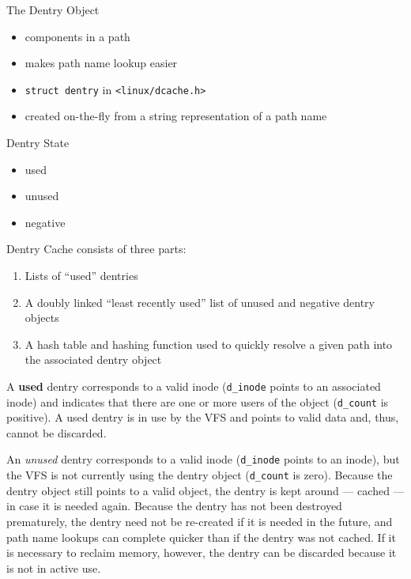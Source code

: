 \begin{frame}
  \begin{block}{The Dentry Object}
    \begin{itemize}
    \item components in a path
    \item makes path name lookup easier
    \item \texttt{struct dentry} in \texttt{<linux/dcache.h>}
    \item created on-the-fly from a string representation of a path name
    \end{itemize}
  \end{block}
\end{frame}

\begin{frame}
  \begin{block}{Dentry State}
    \begin{itemize}
    \item used
    \item unused
    \item negative
    \end{itemize}
  \end{block}
  \begin{block}{Dentry Cache}
    consists of three parts:
    \begin{enumerate}
    \item Lists of “used” dentries
    \item A doubly linked “least recently used” list of unused and negative dentry objects
    \item A hash table and hashing function used to quickly resolve a given path into the
      associated dentry object
    \end{enumerate}
  \end{block}
\end{frame}

A \textbf{used} dentry corresponds to a valid inode (\verb|d_inode| points to an
associated inode) and indicates that there are one or more users of the object
(\verb|d_count| is positive). A used dentry is in use by the VFS and points to valid data
and, thus, cannot be discarded.

An \emph{unused} dentry corresponds to a valid inode (\verb|d_inode| points to an inode),
but the VFS is not currently using the dentry object (\verb|d_count| is zero). Because the
dentry object still points to a valid object, the dentry is kept around --- cached --- in
case it is needed again. Because the dentry has not been destroyed prematurely, the dentry
need not be re-created if it is needed in the future, and path name lookups can complete
quicker than if the dentry was not cached. If it is necessary to reclaim memory, however,
the dentry can be discarded because it is not in active use.

